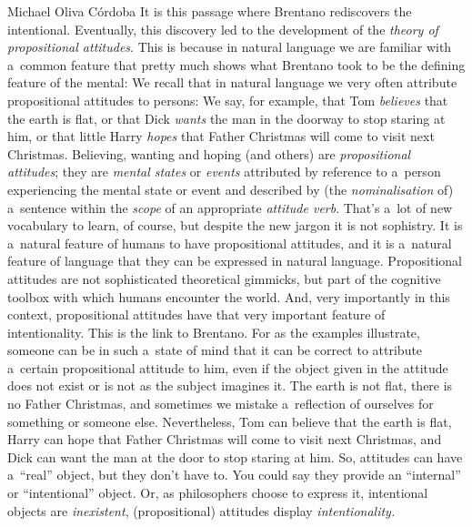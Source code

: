 \begin{artengenv}{Michael Oliva Córdoba}
It is this passage where Brentano rediscovers the intentional. Eventually, this discovery led to the development of the \textit{theory of propositional attitudes}. This is because in natural language we are familiar with a~common feature that pretty much shows what Brentano took to be the defining feature of the mental: We recall that in natural language we very often attribute propositional attitudes to persons: We say, for example, that Tom \textit{believes} that the earth is flat, or that Dick \textit{wants} the man in the doorway to stop staring at him, or that little Harry \textit{hopes} that Father Christmas will come to visit next Christmas. Believing, wanting and hoping (and others) are \textit{propositional attitudes}; they are \textit{mental states} or \textit{events} attributed by reference to a~person experiencing the mental state or event and described by (the \textit{nominalisation} of) a~sentence within the \textit{scope} of an appropriate \textit{attitude verb}. That's a~lot of new vocabulary to learn, of course, but despite the new jargon it is not sophistry. It is a~natural feature of humans to have propositional attitudes, and it is a~natural feature of language that they can be expressed in natural language. Propositional attitudes are not sophisticated theoretical gimmicks, but part of the cognitive toolbox with which humans encounter the world. And, very importantly in this context, propositional attitudes have that very important feature of intentionality. This is the link to Brentano. For as the examples illustrate, someone can be in such a~state of mind that it can be correct to attribute a~certain propositional attitude to him, even if the object given in the attitude does not exist or is not as the subject imagines it. The earth is not flat, there is no Father Christmas, and sometimes we mistake a~reflection of ourselves for something or someone else. Nevertheless, Tom can believe that the earth is flat, Harry can hope that Father Christmas will come to visit next Christmas, and Dick can want the man at the door to stop staring at him. So, attitudes can have a~``real'' object, but they don't have to. You could say they provide an ``internal'' or ``intentional'' object. Or, as philosophers choose to express it, intentional objects are \textit{inexistent}, (propositional) attitudes display \textit{intentionality.}






\end{artengenv}
